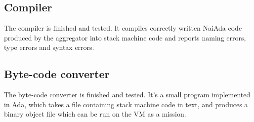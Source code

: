 \subsection{Compiler}
The compiler is finished and tested. It compiles correctly written NaiAda code produced by the aggregator into stack machine code and reports naming errors, type errors and syntax errors.

\subsection{Byte-code converter}
The byte-code converter is finished and tested. It's a small program implemented in Ada, which takes a file containing stack machine code in text, and produces a binary object file which can be run on the VM as a mission.